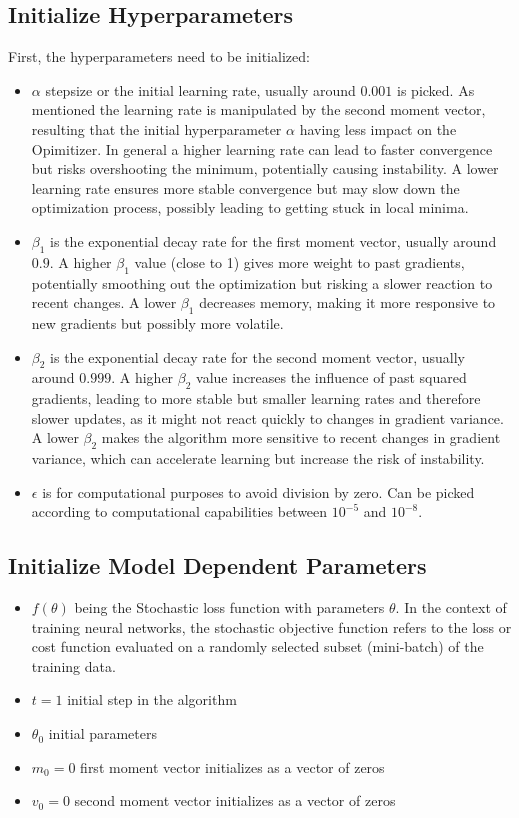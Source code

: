 \documentclass[journal]{IEEEtran}
\begin{document}
\subsection{Initialize Hyperparameters}
First, the hyperparameters need to be initialized:
\begin{itemize}
    \item $\alpha$ stepsize or the initial learning rate, usually around $0.001$ is picked. As mentioned the learning rate is manipulated by the second moment vector, resulting that the initial hyperparameter $\alpha$ having less impact on the Opimitizer. In general a higher learning rate can lead to faster convergence but risks overshooting the minimum, potentially causing instability. A lower learning rate ensures more stable convergence but may slow down the optimization process, possibly leading to getting stuck in local minima. 
    \item $\beta_1$ is the exponential decay rate for the first moment vector, usually around $0.9$. A higher \(\beta_1\) value (close to 1) gives more weight to past gradients, potentially smoothing out the optimization but risking a slower reaction to recent changes. A lower \(\beta_1\) decreases memory, making it more responsive to new gradients but possibly more volatile.
    \item $\beta_2$ is the exponential decay rate for the second moment vector, usually around $0.999$. A higher \(\beta_2\) value increases the influence of past squared gradients, leading to more stable but smaller learning rates and therefore slower updates, as it might not react quickly to changes in gradient variance. A lower \(\beta_2\) makes the algorithm more sensitive to recent changes in gradient variance, which can accelerate learning but increase the risk of instability.
    \item $\epsilon$ is for computational purposes to avoid division by zero. Can be picked according to computational capabilities between $10^{-5}$ and $10^{-8}$.
\end{itemize}
\subsection{Initialize Model Dependent Parameters}
\begin{itemize}
    \item $f(\theta)$ being the Stochastic loss function with parameters $\theta$. In the context of training neural networks, the stochastic objective function refers to the loss or cost function evaluated on a randomly selected subset (mini-batch) of the training data.
    \item $t=1$ initial step in the algorithm
    \item $\theta_0$ initial parameters
    \item $m_0=0$ first moment vector initializes as a vector of zeros
    \item $v_0=0$ second moment vector initializes as a vector of zeros
\end{itemize}
\end{document}

